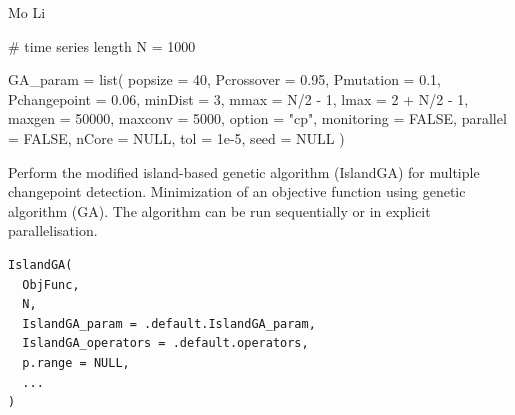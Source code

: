 \documentclass[a4paper]{book}
\begin{document}
%
\begin{Author}
Mo Li
\end{Author}
%
\begin{Examples}
\begin{ExampleCode}
# time series length
N = 1000

GA_param = list(
  popsize      = 40,
  Pcrossover   = 0.95,
  Pmutation    = 0.1,
  Pchangepoint = 0.06,
  minDist      = 3,
  mmax         = N/2 - 1,
  lmax         = 2 + N/2 - 1,
  maxgen       = 50000,
  maxconv      = 5000,
  option       = "cp",
  monitoring   = FALSE,
  parallel     = FALSE,
  nCore        = NULL,
  tol          = 1e-5,
  seed         = NULL
)
\end{ExampleCode}
\end{Examples}
%
\begin{Description}
Perform the modified island-based genetic algorithm (IslandGA) for multiple changepoint detection.
Minimization of an objective function using genetic algorithm (GA).
The algorithm can be run sequentially or in explicit parallelisation.
\end{Description}
%
\begin{Usage}
\begin{verbatim}
IslandGA(
  ObjFunc,
  N,
  IslandGA_param = .default.IslandGA_param,
  IslandGA_operators = .default.operators,
  p.range = NULL,
  ...
)
\end{verbatim}
\end{Usage}
%
\end{document}
